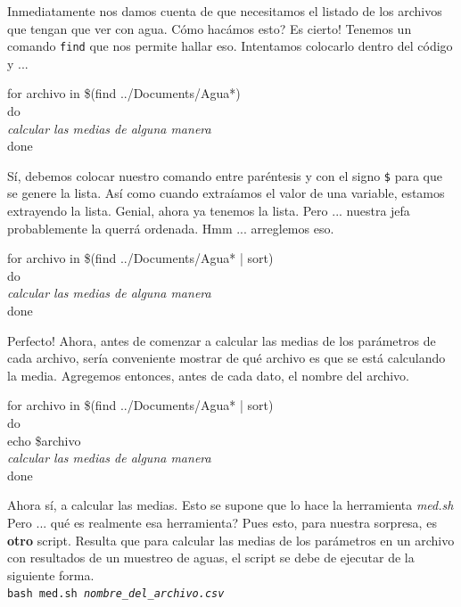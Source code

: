 \documentclass[10pt,letterpaper]{article}
\newcommand{\inlinecode}[1]{
\colorbox{light-gray}{\texttt{#1}}
}
\newenvironment{Code}
{
\begin{lrbox}{\selvestebox}%
\begin{minipage}{\dimexpr\columnwidth-2\fboxsep\relax}
\fontfamily{\ttdefault}\selectfont
}
{\end{minipage}\end{lrbox}%
\begin{center}
\colorbox{light-gray}{\usebox{\selvestebox}}
\end{center}
}
\begin{document}
Inmediatamente nos damos cuenta de que necesitamos el listado de los archivos que tengan que ver con agua. C\'omo hac\'amos esto? Es cierto! Tenemos un comando \inlinecode{find} que nos permite hallar eso. Intentamos colocarlo dentro del c\'odigo y ...

\begin{Code}
for archivo in \$(find ../Documents/Agua*)\\
do\\
\emph{calcular las medias de alguna manera}\\
done
\end{Code}

S\'i, debemos colocar nuestro comando entre par\'entesis y con el signo \inlinecode{\$} para que se genere la lista. As\'i como cuando extra\'iamos el valor de una variable, estamos extrayendo la lista. Genial, ahora ya tenemos la lista. Pero ... nuestra jefa probablemente la querr\'a ordenada. Hmm ... arreglemos eso.

\begin{Code}
for archivo in \$(find ../Documents/Agua* | sort)\\
do\\
\emph{calcular las medias de alguna manera}\\
done
\end{Code}

Perfecto! Ahora, antes de comenzar a calcular las medias de los par\'ametros de cada archivo, ser\'ia conveniente mostrar de qu\'e archivo es que se est\'a calculando la media. Agregemos entonces, antes de cada dato, el nombre del archivo.

\begin{Code}
for archivo in \$(find ../Documents/Agua* | sort)\\
do\\
echo \$archivo\\
\emph{calcular las medias de alguna manera}\\
done
\end{Code}

Ahora s\'i, a calcular las medias. Esto se supone que lo hace la herramienta \emph{med.sh} Pero ... qu\'e es realmente esa herramienta? Pues esto, para nuestra sorpresa, es \textbf{otro} script. Resulta que para calcular las medias de los par\'ametros en un archivo con resultados de un muestreo de aguas, el script se debe de ejecutar de la siguiente forma.\\
\inlinecode{bash med.sh \emph{nombre\_del\_archivo.csv}}\\
\end{document}

